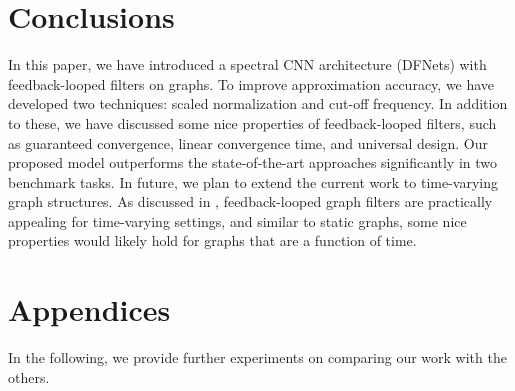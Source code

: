 \documentclass{article}
\begin{document}
\begin{comment}
\begin{figure}[h]
    \centering
    \fbox{\texttt{[image: images/embeddings/cora/GCN\_hidden\_embeddings.png]}} 
    \fbox{\texttt{[image: images/embeddings/cora/GAT\_hidden\_embeddings.png]}}
    \fbox{\texttt{[image: images/embeddings/cora/ARMA\_hidden\_embeddings.png]}} 
    \caption{The t-SNE visualization of the 2-D node embedding space for the Cora dataset in GCN, GAT, and Our method.}
    \label{fig:coraEmbeddings}
\end{figure}
\end{comment}









 \vspace{-0.3cm}
\section{Conclusions}\vspace{-0.3cm}\label{sec:conclusions}
In this paper, we have introduced a spectral CNN architecture (DFNets) with feedback-looped filters on graphs. To improve approximation accuracy, we have developed two techniques: scaled normalization and cut-off frequency. In addition to these, we have discussed some nice properties of feedback-looped filters, such as guaranteed convergence, linear convergence time, and universal design. Our proposed model outperforms the state-of-the-art approaches significantly in two benchmark tasks. In future, we plan to extend the current work to time-varying graph structures. As discussed in \cite{isufi2017autoregressive1}, feedback-looped graph filters are practically appealing for time-varying settings, and similar to static graphs, some nice properties would likely hold for graphs that are a function of time.







 

\newpage



\newpage
\section*{Appendices}

In the following, we provide further experiments on comparing our work with the others. 
\end{document}

